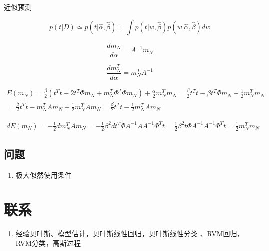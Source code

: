 近似预测

\begin{equation}
p(t|D) \simeq p(t|\hat{\alpha}, \hat{\beta}) = \int p(t|w, \hat \beta)
p(w|\hat \alpha, \hat \beta)dw
\end{equation}

\begin{equation}
\frac{dm_N}{d\alpha} = A^{-1}m_N
\end{equation}

\begin{equation}
\frac{dm_N^T}{d\alpha} = m_N^TA^{-1}
\end{equation}

\begin{equation}
\begin{aligned}
E(m_N) = \frac{\beta}{2}
(t^Tt - 2t^T\Phi m_N + m_N^T\Phi^T\Phi m_N) + \frac{\alpha}{2}m_N^Tm_N
= \frac{\beta}{2}t^Tt - \beta t^T\Phi m_N + \frac{1}{2}m_N^Tm_N \\
= \frac{\beta}{2}t^Tt - m_N^TAm_N + \frac{1}{2}m_N^TAm_N 
= \frac{\beta}{2}t^Tt - \frac{1}{2}m_N^TAm_N
\end{aligned}
\end{equation}

\begin{equation}
\begin{aligned}
dE(m_N) = -\frac{1}{2}dm_N^TAm_N = -\frac{1}{2}\beta^2dt^T\Phi A^{-1}AA^{-1}
\Phi^Tt = \frac{1}{2}\beta^2t\Phi A^{-1}A^{-1}\Phi^Tt
= \frac{1}{2}m_N^Tm_N
\end{aligned}
\end{equation}

\subsection{问题}
\begin{enumerate}
\item 极大似然使用条件
\end{enumerate}

\section{联系}
\begin{enumerate}
\item 经验贝叶斯、模型估计，贝叶斯线性回归，贝叶斯线性分类
、RVM回归，RVM分类，高斯过程
\end{enumerate}
